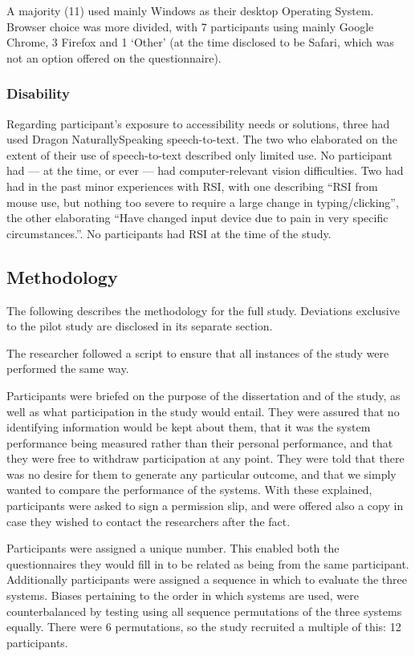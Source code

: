 \documentclass[a4paper, 12pt]{report}
\begin{document}
A majority (11) used mainly Windows as their desktop Operating System. Browser choice was more divided, with 7 participants using mainly Google Chrome, 3 Firefox and 1 `Other' (at the time disclosed to be Safari, which was not an option offered on the questionnaire).

\subsubsection{Disability}
Regarding participant's exposure to accessibility needs or solutions, three had used Dragon NaturallySpeaking speech-to-text. The two who elaborated on the extent of their use of speech-to-text described only limited use. No participant had --- at the time, or ever --- had computer-relevant vision difficulties. Two had had in the past minor experiences with RSI, with one describing ``RSI from mouse use, but nothing too severe to require a large change in typing/clicking'', the other elaborating ``Have changed input device due to pain in very specific circumstances.''. No participants had RSI at the time of the study.

\subsection{Methodology}
The following describes the methodology for the full study. Deviations exclusive to the pilot study are disclosed in its separate section.

The researcher followed a script to ensure that all instances of the study were performed the same way.

Participants were briefed on the purpose of the dissertation and of the study, as well as what participation in the study would entail. They were assured that no identifying information would be kept about them, that it was the system performance being measured rather than their personal performance, and that they were free to withdraw participation at any point. They were told that there was no desire for them to generate any particular outcome, and that we simply wanted to compare the performance of the systems. With these explained, participants were asked to sign a permission slip, and were offered also a copy in case they wished to contact the researchers after the fact.

Participants were assigned a unique number. This enabled both the questionnaires they would fill in to be related as being from the same participant. Additionally participants were assigned a sequence in which to evaluate the three systems. Biases pertaining to the order in which systems are used, were counterbalanced by testing using all sequence permutations of the three systems equally. There were 6 permutations, so the study recruited a multiple of this: 12 participants.
\end{document}
